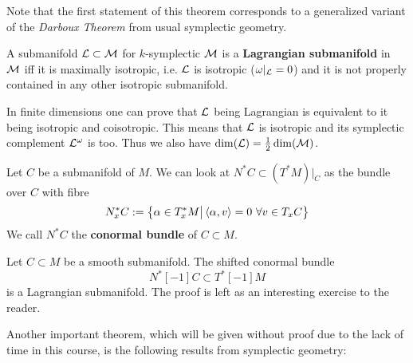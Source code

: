 Note that the first statement of this theorem corresponds to a generalized variant of the \emph{Darboux Theorem} from usual symplectic geometry.

\begin{definition}
  A submanifold $\mathcal{L} \subset \mathcal{M}$ for $k$-symplectic $\mathcal{M}$ is a \textbf{Lagrangian submanifold} in $\mathcal{M}$ iff it is maximally isotropic, i.e. $\mathcal{L}$ is isotropic ($\omega|_{\mathcal{L}} = 0$) and it is not properly contained in any other isotropic submanifold.
\end{definition}

In finite dimensions one can prove that $\mathcal{L}$ being Lagrangian is equivalent to it being isotropic and coisotropic. This means that $\mathcal{L}$ is isotropic and its symplectic complement $\mathcal{L}^\omega$ is too. Thus we also have $\dim(\mathcal{L}) = \frac{1}{2} \dim(\mathcal{M})$.

\begin{definition}
  Let $C$ be a submanifold of $M$. We can look at $ N^* C \subset (T^*M)|_C $ as the bundle over $C$ with fibre
  \begin{equation}
    N_x^* C := \left \{ \alpha \in T_x^*M \big| \left\langle \alpha , v \right\rangle = 0 \ \forall v \in T_x C \right\}
  \end{equation}
  We call $N^* C$ the \textbf{conormal bundle} of $C \subset M$.
\end{definition}

\begin{example}
  Let $C \subset M$ be a smooth submanifold. The shifted conormal bundle
  \begin{equation}
    N^*[-1]C \subset T^*[-1]M
  \end{equation}
  is a Lagrangian submanifold. The proof is left as an interesting exercise to the reader.
\end{example}

Another important theorem, which will be given without proof due to the lack of time in this course, is the following results from symplectic geometry:

